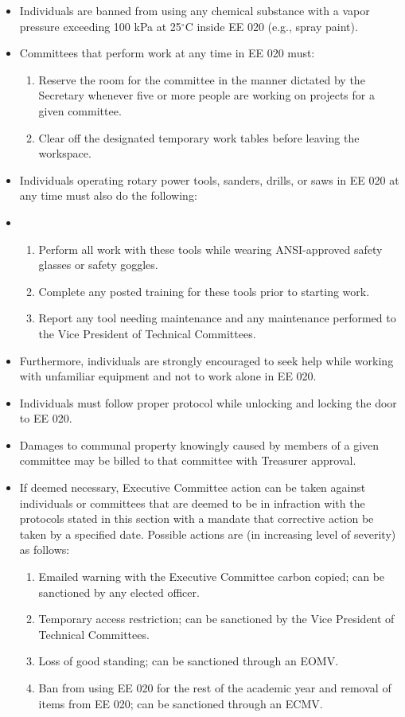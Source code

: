 \documentclass[12pt]{constitution}
\begin{document}
\begin{itemize}
\begin{enumerate}
\begin{itemize}
        \end{itemize}
    \end{enumerate}
    \item Individuals are banned from using any chemical substance with a vapor pressure exceeding 100 kPa at 25$^{\circ}$C inside EE 020 (e.g., spray paint).
    \item Committees that perform work at any time in EE 020 must:
    \begin{enumerate}
        \item Reserve the room for the committee in the manner dictated by the Secretary whenever five or more people are working on projects for a given committee.
        \item Clear off the designated temporary work tables before leaving the workspace.
    \end{enumerate}
    \item Individuals operating rotary power tools, sanders, drills, or saws in EE 020 at any time must also do the following:
    \item
    \begin{enumerate}
        \item Perform all work with these tools while wearing ANSI-approved safety glasses or safety goggles.
        \item Complete any posted training for these tools prior to starting work.
        \item Report any tool needing maintenance and any maintenance performed to the Vice President of Technical Committees.
    \end{enumerate}
    \item Furthermore, individuals are strongly encouraged to seek help while working with unfamiliar equipment and not to work alone in EE 020.
    \item Individuals must follow proper protocol while unlocking and locking the door to EE 020.
    \item Damages to communal property knowingly caused by members of a given committee may be billed to that committee with Treasurer approval.
    \item If deemed necessary, Executive Committee action can be taken against individuals or committees that are deemed to be in infraction with the protocols stated in this section with a mandate that corrective action be taken by a specified date. Possible actions are (in increasing level of severity) as follows:
    \begin{enumerate}
        \item Emailed warning with the Executive Committee carbon copied; can be sanctioned by any elected officer.
        \item Temporary access restriction; can be sanctioned by the Vice President of Technical Committees.
        \item Loss of good standing; can be sanctioned through an EOMV.
        \item Ban from using EE 020 for the rest of the academic year and removal of items from EE 020; can be sanctioned through an ECMV.
    \end{enumerate}
\end{itemize}
\end{document}

